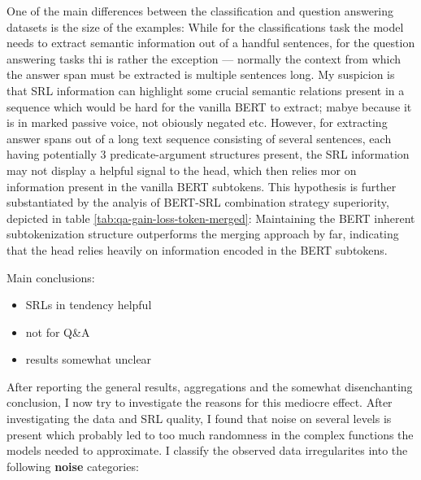 One of the main differences between the classification and question answering datasets is the size of
the examples: While for the classifications task the model needs to extract semantic
information out of a handful sentences, for the question answering tasks thi is rather the exception ---
normally the context from which the answer span must be extracted is multiple sentences long. My suspicion
is that SRL information can highlight some crucial semantic relations present in a sequence which would be
hard for the vanilla BERT to extract; mabye because it is in marked passive voice, not obiously negated etc.
However, for extracting answer spans out of a long text sequence consisting of several sentences, each having
potentially 3 predicate-argument structures present, the SRL information may not display a helpful signal to the
head, which then relies mor on information present in the vanilla BERT subtokens. This hypothesis is further
substantiated by the analyis of BERT-SRL combination strategy superiority, depicted in table \ref{tab:qa-gain-loss-token-merged}:
Maintaining the BERT inherent subtokenization structure outperforms the merging approach by far, indicating that
the head relies heavily on information encoded in the BERT subtokens.






Main conclusions:

\begin{itemize}
  \item SRLs in tendency helpful
  \item not for Q\&A
  \item results somewhat unclear
\end{itemize}


After reporting the general results, aggregations and the somewhat disenchanting conclusion, I
now try to investigate the reasons for this mediocre effect. After investigating the data and
SRL quality, I found that noise on several levels is present which probably led to too much
randomness in the complex functions the models needed to approximate. I classify the observed
data irregularites into the following \textbf{noise} categories:


